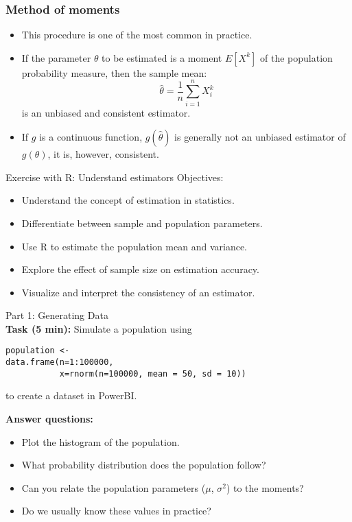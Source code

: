 \documentclass[main.tex]{subfiles}
\begin{document}
\begin{frame}
    \frametitle{Method of moments}
\begin{itemize}
    \item<+-> This procedure is one of the most common in practice.
    \item<+-> If the parameter $\theta$ to be estimated is a moment $E\left[ X^k \right]$ of the population probability measure, then
    the sample mean:
    \begin{equation}
        \hat{\theta} = \frac{1}{n} \sum_{i=1}^n X_i^k
    \end{equation}
    is an unbiased and consistent estimator.
    \item<+-> If $g$ is a continuous function, $g\left(\hat{\theta}\right)$ is generally not an unbiased estimator of $g\left( \theta \right)$, it is, 
    however, consistent.
\end{itemize}
\end{frame}

\begin{frame}
\begin{block}{Exercise with R: Understand estimators}
Objectives:
\begin{itemize}
  \item Understand the concept of estimation in statistics.
  \item Differentiate between sample and population parameters.
  \item Use R to estimate the population mean and variance.
  \item Explore the effect of sample size on estimation accuracy.
  \item Visualize and interpret the consistency of an estimator.
\end{itemize}
\end{block}
\end{frame}


\begin{frame}[fragile]
\begin{block}{Part 1: Generating Data\\}
\textbf{Task (5 min):} Simulate a population using
{\footnotesize
\begin{verbatim}
population <- 
data.frame(n=1:100000,
           x=rnorm(n=100000, mean = 50, sd = 10))
\end{verbatim}}
to create a dataset in PowerBI.

\textbf{Answer questions:}
\begin{itemize}
  \item<+-> Plot the histogram of the population.
  \item<+-> What probability distribution does the population follow? 
  \item<+-> Can you relate the population parameters ($\mu$, $\sigma^2$) to the moments?
  \item<+-> Do we usually know these values in practice?
\end{itemize}
\end{block}
\end{frame}
\end{document}
